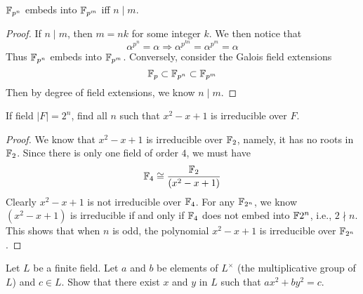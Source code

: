 \begin{prop}
    $\mathbb{F}_{p^n}$ embeds into $\mathbb{F}_{p^m}$ iff $n\mid m$.
\end{prop}
\begin{proof}
    If $n\mid m$, then $m=nk$ for some integer $k$. We then notice that 
    \begin{equation*}
        \alpha^{p^n}=\alpha\Rightarrow \alpha^{p^{kn}}=\alpha^{p^m}=\alpha
    \end{equation*}
   Thus $\mathbb{F}_{p^n}$ embeds into $\mathbb{F}_{p^m}$. Conversely, consider the Galois field extensions 
   \begin{equation*}
        \mathbb{F}_p\subset\mathbb{F}_{p^n}\subset\mathbb{F}_{p^m}
   \end{equation*}
   Then by degree of field extensions, we know $n\mid m$.
\end{proof}



\begin{prob}[F2016-Q3]
    If field $|F|=2^n$, find all $n$ such that $x^2-x+1$ is irreducible over $F$.
\end{prob}
\begin{proof}
    We know that $x^2-x+1$ is irreducible over $\mathbb{F}_2$, namely, it has no roots in $\mathbb{F}_2$. Since there is only one field of order $4$, we must have 
    \begin{equation*}
        \mathbb{F}_4\cong\frac{\mathbb{F}_2}{(x^2-x+1)}
    \end{equation*}
    Clearly $x^2-x+1$ is not irreducible over $\mathbb{F}_4$. For any $\mathbb{F}_{2^n}$, we know $(x^2-x+1)$ is irreducible if and only if $\mathbb{F}_4$ does not embed into $\mathbb{F}{2^n}$, i.e., $2\nmid n$. This shows that when $n$ is odd, the polynomial $x^2-x+1$ is irreducible over $\mathbb{F}_{2^n}$.
\end{proof}


\begin{prob}[F2015-Q5]
    Let \(L\) be a finite field. Let \(a\) and \(b\) be elements of \(L^\times\) (the multiplicative group of \(L\)) and \(c \in L\). Show that there exist \(x\) and \(y\) in \(L\) such that \(ax^2 + by^2 = c\).
\end{prob}



